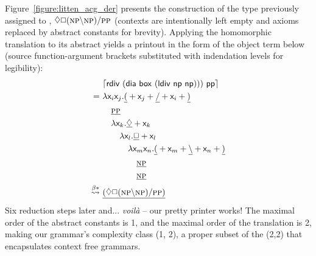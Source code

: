 Figure~\ref{figure:litten_acg_der} presents the construction of the type previously assigned to , $\diamond\Box (\np[s]\divleft\np[s])\divright\pp[s]$ (contexts are intentionally left empty and axioms replaced by abstract constants for brevity).
Applying the homomorphic translation to its abstract yields a printout in the form of the object term below (source function-argument brackets substituted with indendation levels for legibility):
\begin{equation}
	{
	\begin{aligned}
	& 			\hm{\term{rdiv~(dia~box~(ldiv~np~np)))~pp}}\\
	= \
	&				\smallterm{\lam  \vari\varj.\underline{(} + \varj + \underline{\divright} + \vari + \underline{)}}\\
	& \quad			\underline{\smallprop{pp}}\\
	& \quad 		\smallterm{\lam  \vark.\underline{\diamond} + \vark}\\
	& \qquad 		\smallterm{\lam  \varl.\underline{\Box} + \varl}\\
	& \qqquad		\smallterm{\lam  \Var{m}\Var{n}.\underline{(} + \Var{m} + \underline{\divleft} + \Var{n} + \underline{)}} \\
	& \qqqquad		\underline{\smallprop{np}}\\
	& \qqqquad		\underline{\smallprop{np}}\\
	\bredstar \
	&				\underline{(
						\diamond \Box ( \np \divleft \np )
						\divright \pp[s] 
						)}
	\end{aligned}
	}
\end{equation}
Six reduction steps later and... \textit{voil\`{a}} -- our pretty printer works!
The maximal order of the abstract constants is 1, and the maximal order of the translation is 2, making our grammar's complexity class (1, 2), a proper subset of the (2,2) that encapsulates context free grammars.

